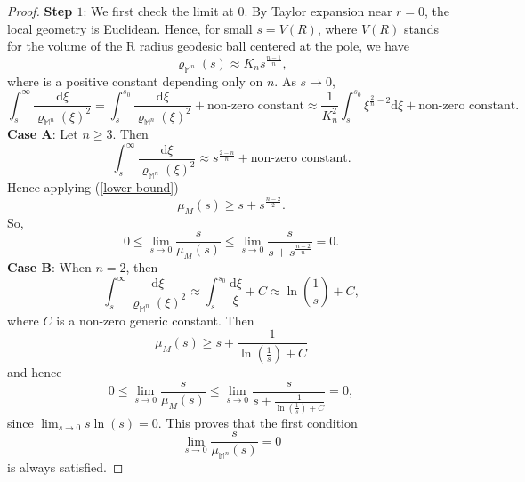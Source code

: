 \documentclass[a4paper,11pt,reqno]{amsart}
\renewcommand\eqref[1]{(\ref{#1})}
\theoremstyle{plain}
\numberwithin{equation}{section} \allowdisplaybreaks
\newcommand{\m}{\mathbb{M}^n}
\begin{document}
\begin{proof}
    
\textbf{Step $1$}: We first check the limit at $0$.
By Taylor expansion near $r=0$, the local geometry is Euclidean. Hence, for small $s=V(R)$, where $V(R)$ stands for the volume of the R radius geodesic ball centered at the pole, we have
\begin{equation*}
    \varrho_{\m}(s)\approx K_n s^{\frac{n-1}{n}},
\end{equation*}
where is a positive constant depending only on $n$. As $s \to 0$,
\begin{equation*}
    \int_s^{\infty}\frac{\mathrm{d}\xi}{\varrho_{\m}(\xi)^2}=\int_s^{s_0}\frac{\mathrm{d}\xi}{\varrho_{\m}(\xi)^2}+\text{non-zero constant}\approx \frac{1}{K_n^2}\int_s^{s_0}\xi^{\frac{2}{n}-2}\mathrm{d}\xi+\text{non-zero constant}.
\end{equation*}
\textbf{Case A}: Let $n\geq 3$. Then
\begin{equation*}
    \int_s^{\infty}\frac{\mathrm{d}\xi}{\varrho_{\m}(\xi)^2}\approx s^{\frac{2-n}{n}}+\text{non-zero constant}.
\end{equation*}
    Hence applying \eqref{lower bound}
    \begin{equation*}
        \mu_M(s)\geq s+s^{\frac{n-2}{2}}.
    \end{equation*}
So,
\begin{equation*}
    0\leq \lim_{s \to 0} \frac{s}{\mu_M(s)}\leq \lim_{s \to 0}\frac{s}{s+s^{\frac{n-2}{n}}}=0.
\end{equation*}
\textbf{Case B}: When $n=2$, then
\begin{equation*}
    \int_s^{\infty} \frac{\mathrm{d}\xi}{\varrho_{\m}(\xi)^2}\approx \int_s^{s_0} \frac{\mathrm{d}\xi}{\xi}+C\approx \ln\left(\frac{1}{s}\right) +C,
\end{equation*}
where $C$ is a non-zero generic constant. Then
\begin{equation*}
   \mu_M(s) \geq s+\frac{1}{\ln\left(\frac{1}{s}\right)+C} 
\end{equation*}
and hence
\begin{equation*}
    0\leq \lim_{s \to 0} \frac{s}{\mu_M(s)}\leq \lim_{s \to 0} \frac{s}{s+\frac{1}{\ln\left(\frac{1}{s}\right)+C}}=0,
\end{equation*}
since $\lim_{s \to 0} s\ln(s)=0$. 
This proves that the first condition $$\lim_{s \to 0}\frac{s}{\mu_{\m}(s)}=0$$ is always satisfied.


\end{proof}
\end{document}
